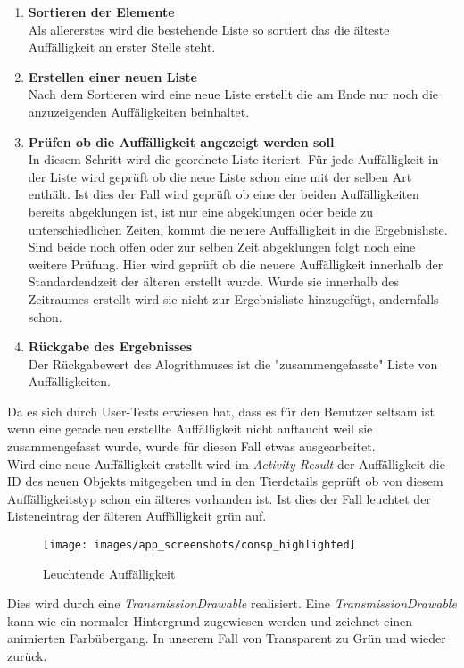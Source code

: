 \begin{enumerate}
\item{\textbf{Sortieren der Elemente}} \\
Als allererstes wird die bestehende Liste so sortiert das die älteste Auffälligkeit an erster Stelle steht.
\item{\textbf{Erstellen einer neuen Liste}} \\
Nach dem Sortieren wird eine neue Liste erstellt die am Ende nur noch die anzuzeigenden Auffäligkeiten beinhaltet. 
\item{\textbf{Prüfen ob die Auffälligkeit angezeigt werden soll}} \\
In diesem Schritt wird die geordnete Liste iteriert. Für jede Auffälligkeit in der Liste wird geprüft ob die neue Liste schon eine mit der selben Art enthält. Ist dies der Fall wird geprüft ob eine der beiden Auffälligkeiten bereits abgeklungen ist, ist nur eine abgeklungen oder beide zu unterschiedlichen Zeiten, kommt die neuere Auffälligkeit in die Ergebnisliste. Sind beide noch offen oder zur selben Zeit abgeklungen folgt noch eine weitere Prüfung. Hier wird geprüft ob die neuere Auffälligkeit innerhalb der Standardendzeit der älteren erstellt wurde. Wurde sie innerhalb des Zeitraumes erstellt wird sie nicht zur Ergebnisliste hinzugefügt, andernfalls schon.
\item{\textbf{Rückgabe des Ergebnisses}} \\
Der Rückgabewert des Alogrithmuses ist die "zusammengefasste" Liste von Auffälligkeiten.
\end{enumerate}
Da es sich durch User-Tests erwiesen hat, dass es für den Benutzer seltsam ist wenn eine gerade neu erstellte Auffälligkeit nicht auftaucht weil sie zusammengefasst wurde, wurde für diesen Fall etwas ausgearbeitet.\\
Wird eine neue Auffälligkeit erstellt wird im \textit{Activity Result} der Auffälligkeit die ID des neuen Objekts mitgegeben und in den Tierdetails geprüft ob von diesem Auffälligkeitstyp schon ein älteres vorhanden ist. Ist dies der Fall leuchtet der Listeneintrag der älteren Auffälligkeit grün auf.
\begin{figure}[H]
\centering
\texttt{[image: images/app\_screenshots/consp\_highlighted]}
\caption{Leuchtende Auffälligkeit}
\end{figure}
Dies wird durch eine \textit{TransmissionDrawable} realisiert. Eine \textit{TransmissionDrawable} kann wie ein normaler Hintergrund zugewiesen werden und zeichnet einen animierten Farbübergang. In unserem Fall von Transparent zu Grün und wieder zurück.
